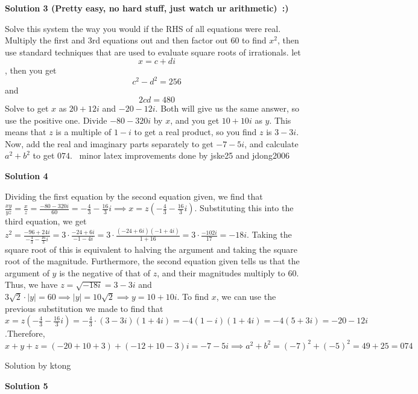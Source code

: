 \begin{enumerate}
 



\textbf{Solution 3 (Pretty easy, no hard stuff, just watch ur arithmetic) :)}

Solve this system the way you would if the RHS of all equations were real. Multiply the first and 3rd equations out and then factor out $60$ to find $x^2$, then use standard techniques that are used to evaluate square roots of irrationals. let 
 \[x = c+di\], then you get 
 \[c^2 - d^2 = 256\] and 
 \[2cd = 480\] Solve to get $x$ as $20+12i$ and $-20-12i$. Both will give us the same answer, so use the positive one. Divide $-80-320i$ by  $x$, and you get $10+10i$ as $y$. This means that $z$ is a multiple of $1-i$ to get a real product, so you find $z$ is $3-3i$. Now, add the real and imaginary parts separately to get $-7-5i$, and calculate $a^2 + b^2$ to get $\boxed{074}$. ~minor latex improvements done by jske25 and jdong2006

 



\textbf{Solution 4}

Dividing the first equation by the second equation given, we find that $\frac{xy}{yz}=\frac{x}{z}=\frac{-80-320i}{60}=-\frac{4}{3}-\frac{16}{3}i \implies x=z\left(-\frac{4}{3}-\frac{16}{3}i\right)$. Substituting this into the third equation, we get $z^2=\frac{-96+24i}{-\frac{4}{3}-\frac{16}{3}i}=3\cdot \frac{-24+6i}{-1-4i}=3\cdot \frac{(-24+6i)(-1+4i)}{1+16}=3\cdot \frac{-102i}{17}=-18i$. Taking the square root of this is equivalent to halving the argument and taking the square root of the magnitude. Furthermore, the second equation given tells us that the argument of $y$ is the negative of that of $z$, and their magnitudes multiply to $60$. Thus, we have $z=\sqrt{-18i}=3-3i$ and $3\sqrt{2}\cdot |y|=60 \implies |y|=10\sqrt{2} \implies y=10+10i$. To find $x$, we can use the previous substitution we made to find that $x=z\left(-\frac{4}{3}-\frac{16}{3}i\right)=-\frac{4}{3}\cdot (3-3i)(1+4i)=-4(1-i)(1+4i)=-4(5+3i)=-20-12i$.Therefore, $x+y+z=(-20+10+3)+(-12+10-3)i=-7-5i \implies a^2+b^2=(-7)^2+(-5)^2=49+25=\boxed{074}$

 Solution by ktong

 



\textbf{Solution 5}


\end{enumerate}
